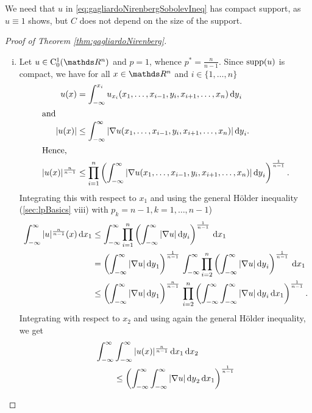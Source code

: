 \begin{rem}
  We need that $u$ in \eqref{eq:gagliardoNirenbergSobolevIneq} has compact support, as $u \equiv 1$ shows, but $C$ does not depend on the size of the support.
\end{rem}

\begin{proof}[Proof of Theorem \ref{thm:gagliardoNirenberg}]
  \begin{enumerate}[i)]
    \item Let $u \in \CC_0^1(\R^n)$ and $p = 1$, whence $p^* = \frac{n}{n - 1}$.
      Since $\operatorname{supp}(u)$ is compact, we have for all $x \in \R^n$ and $i \in \{1,\dots,n\}$
      \begin{align*}
        u(x) &= \int_{-\infty}^{x_i} u_{x_i}(x_1,\dots,x_{i - 1}, y_i, x_{i + 1}, \dots, x_n) \, {\operatorname{d}\!{y}}_i \\
        \intertext{and}
        |u(x)| &\leq \int_{-\infty}^\infty |\nabla u(x_1,\dots,x_{i - 1}, y_i, x_{i + 1}, \dots,x_n)| \, {\operatorname{d}\!{y}}_i. \\
        \intertext{Hence,}
        |u(x)|^{\frac{n}{n - 1}} &\leq \prod_{i = 1}^n \left( \int_{-\infty}^\infty |\nabla u(x_1,\dots,x_{i - 1}, y_i, x_{i + 1}, \dots, x_n) | \, {\operatorname{d}\!{y}}_i \right)^{\frac{1}{n - 1}}.
      \end{align*}
      Integrating this with respect to $x_1$ and using the general Hölder inequality (\ref{sec:lpBasics} viii) with $p_k = n - 1, k = 1,\dots,n - 1$)
      \begin{align*}
        \int_{-\infty}^\infty |u|^{\frac{n}{n - 1}}(x) \d x_1
        &\leq \int_{-\infty}^\infty \prod_{i = 1}^n \left( \int_{-\infty}^\infty |\nabla u| \d y_i \right)^{\frac{1}{n - 1}} \d x_1 \\
        &= \left( \int_{-\infty}^\infty |\nabla u| \d y_1 \right)^{\frac{1}{n - 1}} \, \int_{-\infty}^\infty \prod_{i = 2}^n \left( \int_{-\infty}^\infty |\nabla u| \d y_i \right)^{\frac{1}{n - 1}} \d x_1 \\
        &\leq \left( \int_{-\infty}^\infty |\nabla u| \d y_1 \right)^{\frac{n}{n - 1}} \, \prod_{i = 2}^n \left( \int_{-\infty}^\infty \int_{-\infty}^\infty |\nabla u| \d y_i \d x_1 \right)^{\frac{1}{n - 1}}.
      \end{align*}
      Integrating with respect to $x_2$ and using again the general Hölder inequality, we get
      \begin{align*}
        \int_{-\infty}^\infty &\int_{-\infty}^\infty |u(x)|^{\frac{n}{n - 1}} \d x_1 \d x_2 \\
        &\leq \left( \int_{-\infty}^\infty \int_{-\infty}^\infty |\nabla u| \d y_2 \d x_1 \right)^{\frac{1}{n - 1}} \\

\end{align*}
\end{enumerate}
\end{proof}
